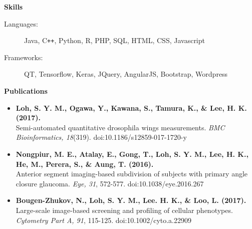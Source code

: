 \documentclass[letterpaper,11pt]{article}
\newcommand{\resheading}[1]{{\large \colorbox{mygrey}{\begin{minipage}{\textwidth}{\textbf{#1 \vphantom{p\^{E}}}}\end{minipage}}}}
\begin{document}
\resheading{Skills}

\begin{description}
\item[Languages:]
Java, C{}\verb!++!, Python, R, PHP, SQL, HTML, CSS, Javascript
\item[Frameworks:]
QT, Tensorflow, Keras, JQuery, AngularJS, Bootstrap, Wordpress
\end{description}

\resheading{Publications}

\begin{itemize}
  \item \textbf{Loh, S. Y. M., Ogawa, Y., Kawana, S., Tamura, K., \& Lee, H. K. (2017).} \\ Semi-automated quantitative drosophila wings measurements. \textit{BMC Bioinformatics, 18}(319). doi:10.1186/s12859-017-1720-y 
  \item \textbf{Nongpiur, M. E., Atalay, E., Gong, T., Loh, S. Y. M., Lee, H. K., He, M., Perera, S., \& Aung, T. (2016).} \\  Anterior segment imaging-based subdivision of subjects with primary angle closure glaucoma. \textit{Eye, 31}, 572-577. doi:10.1038/eye.2016.267
  \item \textbf{Bougen-Zhukov, N., Loh, S. Y. M., Lee. H. K., \& Loo, L. (2017).} \\ Large-scale image-based screening and profiling of cellular phenotypes. \textit{Cytometry Part A, 91}, 115-125. doi:10.1002/cyto.a.22909
\end{itemize}
\end{document}
